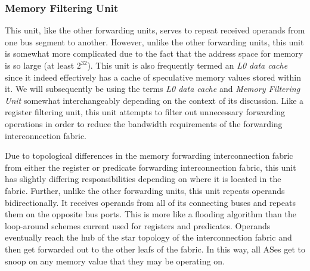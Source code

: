 \subsubsection{Memory Filtering Unit}
%
This unit, like the other forwarding units, serves to repeat
received operands from one bus segment to another.
However, unlike the other forwarding units, this unit is somewhat
more complicated due to the fact that the address space for
memory is so large (at least $ 2 ^ { 32 } $).
This unit is also frequently termed an \textit{L0 data cache}
since it indeed effectively has a cache of speculative
memory values stored within it.
We will subsequently be using the terms \textit{L0 data cache}
and \textit{Memory Filtering Unit} somewhat interchangeably
depending on the context of its discussion.
Like a register filtering unit, this unit attempts to
filter out unnecessary forwarding operations in order to
reduce the bandwidth requirements of the forwarding interconnection
fabric.

Due to topological differences in the memory forwarding interconnection
fabric from either the register or predicate forwarding interconnection
fabric, this unit has slightly differing responsibilities depending
on where it is located in the fabric.  Further, unlike the other
forwarding units, this unit repeats
operands bidirectionally.
It receives operands from all of its connecting buses
and repeats them on the opposite bus ports.
This is more like a flooding algorithm than the loop-around
schemes current used for registers and predicates.
Operands eventually reach the hub of the star topology of the
interconnection fabric and then get forwarded out to the
other leafs of the fabric.  In this way, all ASes get to
snoop on any memory value that they may be operating on.
%
